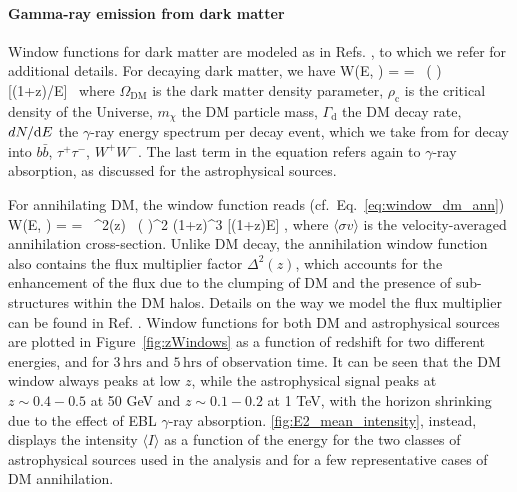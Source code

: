 \paragraph{Gamma-ray emission from dark matter}
\label{app:WDM}

Window functions for dark matter are modeled as in Refs. \cite{Camera_2015,Fornengo:2013rga,Cuoco:2015rfa}, to which we refer for additional details. For decaying dark matter, we have
%
 \be
     W(E, \chi) =  = \, \left ( \right) \,   [(1+z)/E] \, \exp[-\tau(E,z)]
     \label{eqn:Wdec}
 \ee
%
where $\varOmega_\textrm{DM}$ is the dark matter density parameter, $\rho_\textrm{c}$ is the critical density of the Universe,
$m_{\chi}$ the DM particle mass, $\varGamma_\textrm{d}$ the DM decay rate, $dN/\textrm{d} E$ the $\gamma$-ray energy spectrum per decay event, which we take from \cite{Arina:2023eic} for decay into $b\bar{b}$, $\tau^+ \tau^-$, $W^+ W^-$. The last term in the equation refers again to $\gamma$-ray absorption, as discussed for the astrophysical sources.


For annihilating DM, the window function reads (cf.\ Eq.~\ref{eq:window_dm_ann})
%
 \be
     W(E, \chi) =  =  \,  \varDelta^2(z) \, \left ( \right)^2 (1+z)^3  [(1+z)E]  \exp[-\tau(E,z)]\;,
     \label{eqn:Wann}
 \ee
%
where  $\langle \sigma v \rangle$ is the velocity-averaged annihilation cross-section. Unlike DM decay, the annihilation window function also contains the flux multiplier factor $\varDelta^2(z)$, which accounts for the enhancement of the flux due to the clumping of DM and the presence of sub-structures within the DM halos. Details on the way we model the flux multiplier can be found in Ref. \cite{Pinetti:2021jjs,Pinetti:2019ztr,Arcari:2022zul}.
Window functions for both DM and astrophysical sources are plotted in Figure~\ref{fig:zWindows} as a function of redshift for two different energies, and for $3\,\textrm{hrs}$ and $5\,\textrm{hrs}$ of observation time. It can be seen that the DM window always peaks at low $z$, while the astrophysical signal peaks at $z\sim 0.4-0.5$ at 50 GeV and  $z\sim 0.1-0.2$ at 1 TeV, with the horizon shrinking due to the effect of EBL $\gamma$-ray absorption.
\cref{fig:E2_mean_intensity}, instead, displays the intensity $\langle I \rangle$ as a function of the energy for the two classes of astrophysical sources used in the analysis and for a few representative cases of DM annihilation. 


